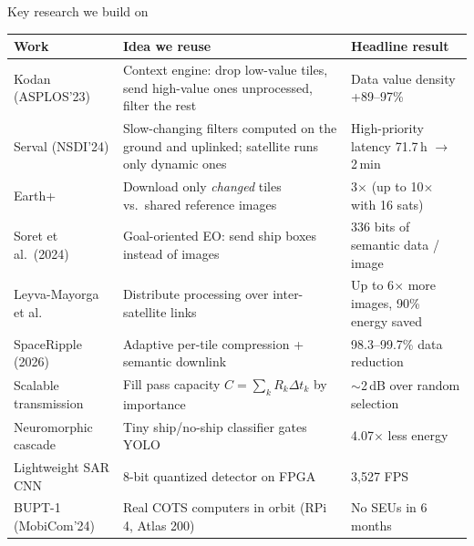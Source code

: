 \documentclass[aspectratio=169,10pt]{beamer}
\begin{document}
\begin{frame}{Key research we build on}
\scriptsize
\renewcommand{\arraystretch}{1.1}
\begin{tabularx}{\textwidth}{@{}l L l@{}}
\toprule
\textbf{Work} & \textbf{Idea we reuse} & \textbf{Headline result} \\
\midrule
Kodan (ASPLOS'23) & Context engine: drop low-value tiles, send high-value ones unprocessed, filter the rest & Data value density +89--97\% \\
Serval (NSDI'24) & Slow-changing filters computed on the ground and uplinked; satellite runs only dynamic ones & High-priority latency 71.7\,h $\rightarrow$ 2\,min \\
Earth+ & Download only \emph{changed} tiles vs.\ shared reference images & 3$\times$ (up to 10$\times$ with 16 sats) \\
Soret et al.\ (2024) & Goal-oriented EO: send ship boxes instead of images & 336 bits of semantic data / image \\
Leyva-Mayorga et al. & Distribute processing over inter-satellite links & Up to 6$\times$ more images, 90\% energy saved \\
SpaceRipple (2026) & Adaptive per-tile compression + semantic downlink & 98.3--99.7\% data reduction \\
Scalable transmission & Fill pass capacity $C=\sum_k R_k\Delta t_k$ by importance & $\sim$2\,dB over random selection \\
Neuromorphic cascade & Tiny ship/no-ship classifier gates YOLO & 4.07$\times$ less energy \\
Lightweight SAR CNN & 8-bit quantized detector on FPGA & 3,527 FPS \\
BUPT-1 (MobiCom'24) & Real COTS computers in orbit (RPi 4, Atlas 200) & No SEUs in 6 months \\
\bottomrule
\end{tabularx}
\end{frame}
\end{document}
